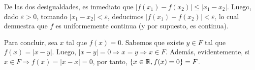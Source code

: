 {	De las dos desigualdades, es inmediato que $|f(x_1)-f(x_2)| \leq |x_1-x_2|$.
	Luego, dado $\varepsilon>0$, tomando $|x_1-x_2|<\varepsilon$, deducimos $|f(x_1)-f(x_2)|<\varepsilon$, lo cual demuestra que $f$ es uniformemente continua (y por supuesto, es continua).

	Para concluir, sea $x$ tal que $f(x)=0$.
	Sabemos que existe $y\in F$ tal que $f(x)=|x-y|$.
	Luego, $|x-y|=0 \Rightarrow x=y \Rightarrow x\in F$.
	Además, evidentemente, si $x\in F \Rightarrow f(x)=|x-x|=0$, por tanto, $\left\{x\in\mathbb{R},f(x)=0\right\} = F$.
}